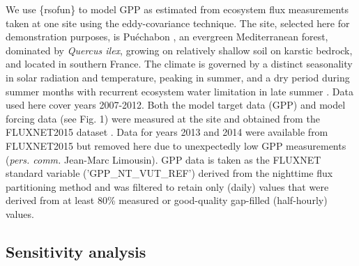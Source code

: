 \documentclass[gmd, manuscript]{copernicus}
\begin{document}
We use \{rsofun\} to model GPP as estimated from ecosystem flux measurements taken at one site using the eddy-covariance technique. The site, selected here for demonstration purposes, is Puéchabon \citep{rambal2004}, an evergreen Mediterranean forest, dominated by \textit{Quercus ilex}, growing on relatively shallow soil on karstic bedrock, and located in southern France. The climate is governed by a distinct seasonality in solar radiation and temperature, peaking in summer, and a dry period during summer months with recurrent ecosystem water limitation in late summer \citep{rambal2004}. Data used here cover years 2007-2012. Both the model target data (GPP) and model forcing data (see Fig. 1) were measured at the site and obtained from the FLUXNET2015 dataset \citep{pastorello2020}. Data for years 2013 and 2014 were available from FLUXNET2015 but removed here due to unexpectedly low GPP measurements (\textit{pers. comm.} Jean-Marc Limousin). GPP data is taken as the FLUXNET standard variable ('GPP\_NT\_VUT\_REF') derived from the nighttime flux partitioning method \citep{reichstein2005} and was filtered to retain only (daily) values that were derived from at least 80\% measured or good-quality gap-filled (half-hourly) values.

\subsection{Sensitivity analysis}
\end{document}
